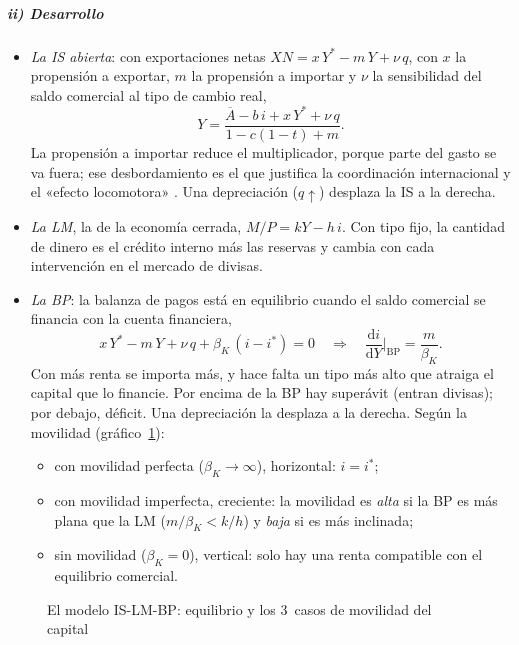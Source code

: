 \documentclass[11pt]{article}
\begin{document}
\subparagraph{ii) Desarrollo}

\begin{itemize}
\item \emph{La IS abierta}: con exportaciones netas $XN=x\,Y^*-m\,Y+\nu\,q$, con $x$ la propensión a exportar, $m$ la propensión a importar y $\nu$ la sensibilidad del saldo comercial al tipo de cambio real,
  \begin{equation*}
  Y=\frac{\overline{A}-b\,i+x\,Y^*+\nu\,q}{1-c(1-t)+m}.
  \end{equation*}
  La propensión a importar reduce el multiplicador, porque parte del gasto se va fuera; ese desbordamiento es el que justifica la coordinación internacional y el «efecto locomotora» . Una depreciación ($q\uparrow$) desplaza la IS a la derecha.
\item \emph{La LM}, la de la economía cerrada, $M/P=kY-h\,i$. Con tipo fijo, la cantidad de dinero es el crédito interno más las reservas y cambia con cada intervención en el mercado de divisas.
\item \emph{La BP}: la balanza de pagos está en equilibrio cuando el saldo comercial se financia con la cuenta financiera,
  \begin{equation*}
  x\,Y^*-m\,Y+\nu\,q+\beta_K\,(i-i^*)=0\quad\Longrightarrow\quad \frac{\mathrm{d}i}{\mathrm{d}Y}\bigg|_{\mathrm{BP}}=\frac{m}{\beta_K}.
  \end{equation*}
  Con más renta se importa más, y hace falta un tipo más alto que atraiga el capital que lo financie. Por encima de la BP hay superávit (entran divisas); por debajo, déficit. Una depreciación la desplaza a la derecha. Según la movilidad (gráfico~\ref{fig:mf-is-lm-bp}):
  \begin{itemize}
  \item con movilidad perfecta ($\beta_K\to\infty$), horizontal: $i=i^*$;
  \item con movilidad imperfecta, creciente: la movilidad es \emph{alta} si la BP es más plana que la LM ($m/\beta_K<k/h$) y \emph{baja} si es más inclinada;
  \item sin movilidad ($\beta_K=0$), vertical: solo hay una renta compatible con el equilibrio comercial.
  \end{itemize}
\end{itemize}

\begin{figure}[H]
\centering
\caption{El modelo IS-LM-BP: equilibrio y los 3~casos de movilidad del capital}\label{fig:mf-is-lm-bp}
\end{figure}
\end{document}
